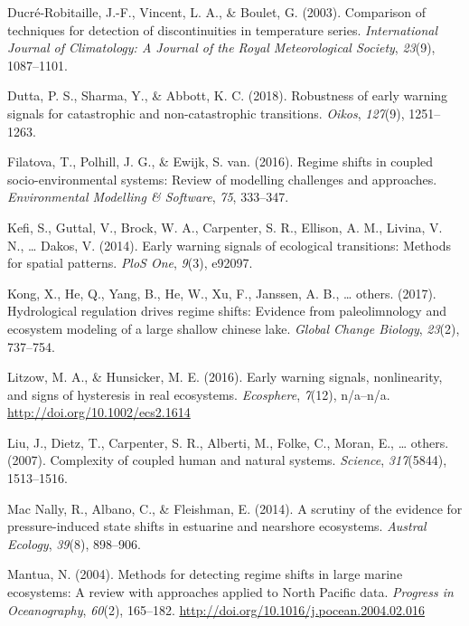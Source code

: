 \documentclass[12pt,twoside,openany]{reedthesis}
\begin{document}
\hypertarget{ref-ducre2003comparison}{}
Ducré-Robitaille, J.-F., Vincent, L. A., \& Boulet, G. (2003).
Comparison of techniques for detection of discontinuities in temperature
series. \emph{International Journal of Climatology: A Journal of the
Royal Meteorological Society}, \emph{23}(9), 1087--1101.

\hypertarget{ref-dutta2018robustness}{}
Dutta, P. S., Sharma, Y., \& Abbott, K. C. (2018). Robustness of early
warning signals for catastrophic and non-catastrophic transitions.
\emph{Oikos}, \emph{127}(9), 1251--1263.

\hypertarget{ref-filatova2016regime}{}
Filatova, T., Polhill, J. G., \& Ewijk, S. van. (2016). Regime shifts in
coupled socio-environmental systems: Review of modelling challenges and
approaches. \emph{Environmental Modelling \& Software}, \emph{75},
333--347.

\hypertarget{ref-kefi2014early}{}
Kefi, S., Guttal, V., Brock, W. A., Carpenter, S. R., Ellison, A. M.,
Livina, V. N., \ldots{} Dakos, V. (2014). Early warning signals of
ecological transitions: Methods for spatial patterns. \emph{PloS One},
\emph{9}(3), e92097.

\hypertarget{ref-kong2017hydrological}{}
Kong, X., He, Q., Yang, B., He, W., Xu, F., Janssen, A. B., \ldots{}
others. (2017). Hydrological regulation drives regime shifts: Evidence
from paleolimnology and ecosystem modeling of a large shallow chinese
lake. \emph{Global Change Biology}, \emph{23}(2), 737--754.

\hypertarget{ref-litzow_early_2016}{}
Litzow, M. A., \& Hunsicker, M. E. (2016). Early warning signals,
nonlinearity, and signs of hysteresis in real ecosystems.
\emph{Ecosphere}, \emph{7}(12), n/a--n/a.
\url{http://doi.org/10.1002/ecs2.1614}

\hypertarget{ref-liu_complexity_2007}{}
Liu, J., Dietz, T., Carpenter, S. R., Alberti, M., Folke, C., Moran, E.,
\ldots{} others. (2007). Complexity of coupled human and natural
systems. \emph{Science}, \emph{317}(5844), 1513--1516.

\hypertarget{ref-mac2014scrutiny}{}
Mac Nally, R., Albano, C., \& Fleishman, E. (2014). A scrutiny of the
evidence for pressure-induced state shifts in estuarine and nearshore
ecosystems. \emph{Austral Ecology}, \emph{39}(8), 898--906.

\hypertarget{ref-mantua_methods_2004}{}
Mantua, N. (2004). Methods for detecting regime shifts in large marine
ecosystems: A review with approaches applied to North Pacific data.
\emph{Progress in Oceanography}, \emph{60}(2), 165--182.
\url{http://doi.org/10.1016/j.pocean.2004.02.016}
\end{document}
